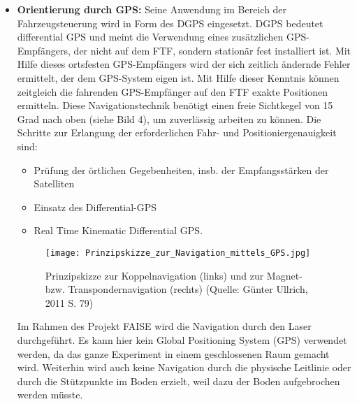 \begin{itemize}
	\item \textbf{Orientierung durch GPS:} Seine Anwendung im Bereich der Fahrzeugsteuerung wird in Form des DGPS eingesetzt.
DGPS bedeutet differential GPS und meint die Verwendung eines zus\"atzlichen GPS-Empf\"angers, der nicht auf dem FTF, sondern station\"ar fest installiert ist.
Mit Hilfe dieses ortsfesten GPS-Empf\"angers wird der sich zeitlich \"andernde Fehler ermittelt, der dem GPS-System eigen ist.
Mit Hilfe dieser Kenntnis k\"onnen zeitgleich die fahrenden GPS-Empf\"anger auf den FTF exakte Positionen ermitteln\cite[S. 112]{Guenther:2011}.
Diese Navigationstechnik benötigt einen freie Sichtkegel von 15 Grad nach oben (siehe Bild 4), um zuverl\"assig arbeiten zu k\"onnen.
Die Schritte zur Erlangung der erforderlichen Fahr- und Positioniergenauigkeit sind:
	\begin{itemize}
		\item Pr\"ufung der \"ortlichen Gegebenheiten, insb. der Empfangsst\"arken der Satelliten
 \item Einsatz des Differential-GPS
 \item Real Time Kinematic Differential GPS. 
\end{itemize}
	\begin{figure}[h!]
		\centering
		\texttt{[image: Prinzipskizze\_zur\_Navigation\_mittels\_GPS.jpg]}
		\caption{Prinzipskizze zur Koppelnavigation (links) und zur Magnet- bzw. Transpondernavigation (rechts) (Quelle: G\"unter Ullrich, 2011 S. 79)}
		\label{Systemarchitektur_FTS}
\end{figure}
Im Rahmen des Projekt FAISE wird die Navigation durch den Laser durchgef\"uhrt. Es kann hier kein Global Positioning 
System (GPS) verwendet werden, da das ganze Experiment in einem geschlossenen Raum gemacht wird.
Weiterhin wird auch keine Navigation durch die physische Leitlinie oder durch die St\"utzpunkte im Boden erzielt, weil dazu der Boden aufgebrochen werden m\"usste.
\end{itemize}

